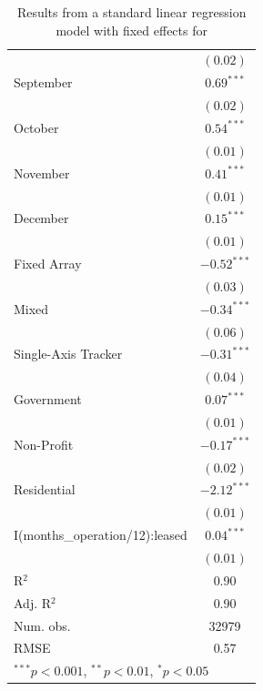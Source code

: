 \documentclass[12pt]{article}
\begin{document}
\begin{table}
\begin{center}
\begin{tabular}{l c }
                                                       & $(0.02)$      \\
September                                         & $0.69^{***}$  \\
                                                       & $(0.02)$      \\
October                                       & $0.54^{***}$  \\
                                                       & $(0.01)$      \\
November                                       & $0.41^{***}$  \\
                                                       & $(0.01)$      \\
December                                        & $0.15^{***}$  \\
                                                       & $(0.01)$      \\
Fixed Array                            & $-0.52^{***}$ \\
                                                       & $(0.03)$      \\
Mixed                                  & $-0.34^{***}$ \\
                                                       & $(0.06)$      \\
Single-Axis Tracker                    & $-0.31^{***}$ \\
                                                       & $(0.04)$      \\
Government                               & $0.07^{***}$  \\
                                                       & $(0.01)$      \\
Non-Profit                               & $-0.17^{***}$ \\
                                                       & $(0.02)$      \\
Residential                              & $-2.12^{***}$ \\
                                                       & $(0.01)$      \\
I(months\_operation/12):leased & $0.04^{***}$  \\
                                                       & $(0.01)$      \\
\hline
R$^2$                                                  & 0.90          \\
Adj. R$^2$                                             & 0.90          \\
Num. obs.                                              & 32979         \\
RMSE                                                   & 0.57          \\
\hline
\multicolumn{2}{l}{\scriptsize{$^{***}p<0.001$, $^{**}p<0.01$, $^*p<0.05$}}
\end{tabular}
\caption{Results from a standard linear regression model with fixed effects for }
\label{table:max_likelihood}
\end{center}
\end{table}
\end{document}

